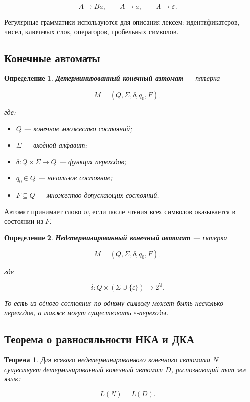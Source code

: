 \documentclass[12pt,a4paper]{article}
\newtheorem{theorem}{Теорема}
\newtheorem{definition}{Определение}
\begin{document}
\[
A \to Ba,\qquad A \to a,\qquad A \to \varepsilon.
\]

Регулярные грамматики используются для описания лексем: идентификаторов, чисел, ключевых слов, операторов, пробельных символов.

\subsection{Конечные автоматы}

\begin{definition}
\textbf{Детерминированный конечный автомат} --- пятерка

\[
M = (Q,\Sigma,\delta,q_0,F),
\]

где:
\begin{itemize}
    \item $Q$ --- конечное множество состояний;
    \item $\Sigma$ --- входной алфавит;
    \item $\delta: Q \times \Sigma \to Q$ --- функция переходов;
    \item $q_0 \in Q$ --- начальное состояние;
    \item $F \subseteq Q$ --- множество допускающих состояний.
\end{itemize}
\end{definition}

Автомат принимает слово $w$, если после чтения всех символов оказывается в состоянии из $F$.

\begin{definition}
\textbf{Недетерминированный конечный автомат} --- пятерка

\[
M = (Q,\Sigma,\delta,q_0,F),
\]

где

\[
\delta: Q \times (\Sigma \cup \{\varepsilon\}) \to 2^Q.
\]

То есть из одного состояния по одному символу может быть несколько переходов, а также могут существовать $\varepsilon$-переходы.
\end{definition}

\subsection{Теорема о равносильности НКА и ДКА}

\begin{theorem}
Для всякого недетерминированного конечного автомата $N$ существует детерминированный конечный автомат $D$, распознающий тот же язык:

\[
L(N)=L(D).
\]
\end{theorem}
\end{document}
